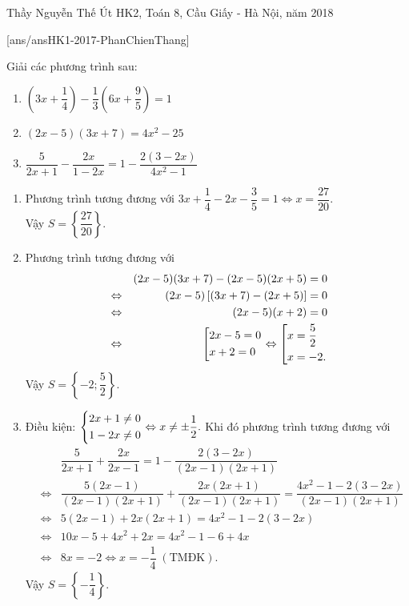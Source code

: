 
\begin{name}
{Thầy  Nguyễn Thế Út}
{HK2, Toán 8, Cầu Giấy - Hà Nội, năm 2018}
\end{name}
\setcounter{ex}{0}
[ans/ansHK1-2017-PhanChienThang]
\begin{ex}%
    Giải các phương trình sau:
    \begin{multicols}{2}
    \begin{enumerate}
        \item $\left(3x+\dfrac{1}{4}\right)-\dfrac{1}{3}\left(6x+\dfrac{9}{5}\right)=1$
        \item $(2x-5)(3x+7)=4x^2-25$
        \item $\dfrac{5}{2x+1}-\dfrac{2x}{1-2x}=1-\dfrac{2(3-2x)}{4x^2-1}$
    \end{enumerate}
    \end{multicols}
\loigiai
    {\begin{enumerate}
        \item Phương trình tương đương với $3x+\dfrac{1}{4}-2x-\dfrac{3}{5}=1\Leftrightarrow x=\dfrac{27}{20}.$\\Vậy $S=\left\lbrace \dfrac{27}{20}\right\rbrace .$
        \item Phương trình tương đương với
        \begin{eqnarray*}
       &&(2x-5)(3x+7)-(2x-5)(2x+5)=0\\&\Leftrightarrow &(2x-5)\left[(3x+7)-(2x+5)\right]=0\\&\Leftrightarrow &(2x-5)(x+2)=0\\&\Leftrightarrow &\left[\begin{aligned}&2x-5=0\\&x+2=0\end{aligned}\right.\Leftrightarrow\left[\begin{aligned}&x=\dfrac{5}{2}\\&x=-2.\end{aligned}\right.
        \end{eqnarray*}
        Vậy $S=\left\lbrace -2;\dfrac{5}{2} \right\rbrace .$
        \item Điều kiện: $\left\{\begin{aligned}&2x+1\neq 0\\&1-2x\neq 0\end{aligned}\right.\Leftrightarrow x\neq \pm \dfrac{1}{2}.$ Khi đó phương trình tương đương với 
        \begin{eqnarray*}
        && \dfrac{5}{2x+1}+\dfrac{2x}{2x-1}=1-\dfrac{2(3-2x)}{(2x-1)(2x+1)}\\&\Leftrightarrow & \dfrac{5(2x-1)}{(2x-1)(2x+1)}+\dfrac{2x(2x+1)}{(2x-1)(2x+1)}=\dfrac{4x^2-1-2(3-2x)}{(2x-1)(2x+1)}\\&\Leftrightarrow &5(2x-1)+2x(2x+1)=4x^2-1-2(3-2x)\\&\Leftrightarrow &10x-5+4x^2+2x=4x^2-1-6+4x\\&\Leftrightarrow & 8x=-2\Leftrightarrow x=-\dfrac{1}{4}\;(\text{TMĐK}).
        \end{eqnarray*}
        Vậy $S=\left\lbrace -\dfrac{1}{4}\right\rbrace .$
    \end{enumerate}
    }
\end{ex}

